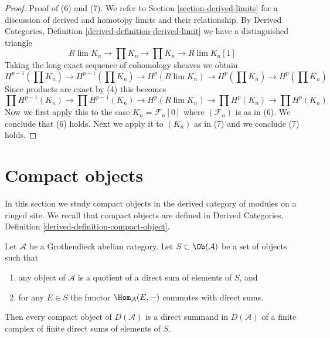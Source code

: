 \begin{proof}
\medskip\noindent
Proof of (6) and (7). We refer to Section \ref{section-derived-limits}
for a discussion of derived and homotopy limits and their relationship.
By Derived Categories, Definition \ref{derived-definition-derived-limit}
we have a distinguished
triangle
$$
R\lim K_n \to \prod K_n \to \prod K_n \to R\lim K_n[1]
$$
Taking the long exact sequence of cohomology sheaves we obtain
$$
H^{p - 1}(\prod K_n) \to H^{p - 1}(\prod K_n) \to
H^p(R\lim K_n) \to H^p(\prod K_n) \to H^p(\prod K_n)
$$
Since products are exact by (4) this becomes
$$
\prod H^{p - 1}(K_n) \to \prod H^{p - 1}(K_n) \to
H^p(R\lim K_n) \to \prod H^p(K_n) \to \prod H^p(K_n)
$$
Now we first apply this to the case $K_n = \mathcal{F}_n[0]$
where $(\mathcal{F}_n)$ is as in (6). We conclude that (6) holds.
Next we apply it to $(K_n)$ as in (7) and we conclude (7) holds.
\end{proof}






\section{Compact objects}
\label{section-compact}

\noindent
In this section we study compact objects in the derived category of modules
on a ringed site. We recall that compact objects are defined in
Derived Categories, Definition \ref{derived-definition-compact-object}.

\begin{lemma}
\label{lemma-compact-in-terms-of-generators}
Let $\mathcal{A}$ be a Grothendieck abelian category. Let
$S \subset \Ob(\mathcal{A})$ be a set of objects such that
\begin{enumerate}
\item any object of $\mathcal{A}$ is a quotient of a direct sum
of elements of $S$, and
\item for any $E \in S$ the functor $\Hom_\mathcal{A}(E, -)$
commutes with direct sums.
\end{enumerate}
Then every compact object of $D(\mathcal{A})$ is a direct summand
in $D(\mathcal{A})$ of a finite complex of finite direct sums of
elements of $S$.
\end{lemma}

